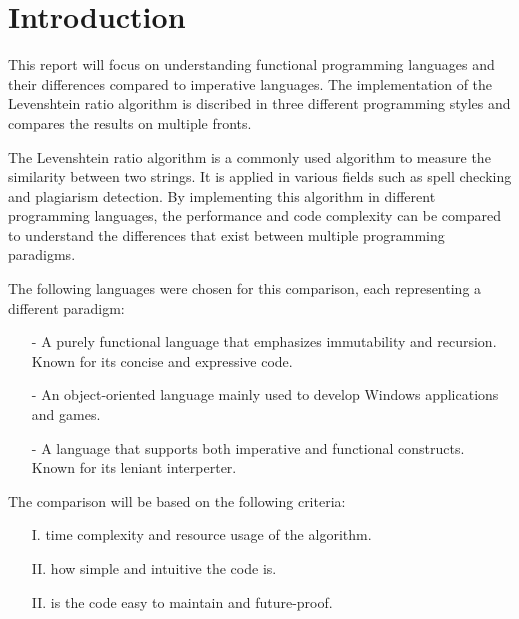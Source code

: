 \section{Introduction}
\label{sec:introduction}
This report will focus on understanding functional programming
languages and their differences compared to imperative languages.
The implementation of the Levenshtein ratio algorithm is discribed in three
different programming styles and compares the results on multiple fronts.

The Levenshtein ratio algorithm is a commonly used
algorithm to measure the similarity between two strings.
It is applied in various fields such as spell checking and plagiarism detection.
By implementing this algorithm in different programming languages,
the performance and code complexity can be compared to understand the differences that
exist between multiple programming paradigms.

The following languages were chosen for this comparison, each representing a different paradigm:
\begin{itemize}
  \item[-]  A purely functional language that
  emphasizes immutability and recursion. Known for its concise and expressive code.
  \item[-]  An object-oriented language mainly
  used to develop Windows applications and games.
  \item[-]  A language that supports both
  imperative and functional constructs. Known for its leniant interperter.
\end{itemize}

The comparison will be based on the following criteria:
\begin{enumerate}
  \item[I.]  time complexity and resource usage of the algorithm.
  \item[II.]  how simple and intuitive the code is.
  \item[II.]  is the code easy to maintain and future-proof.
\end{enumerate}
